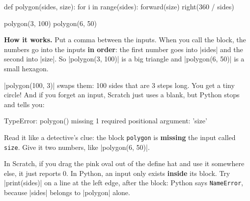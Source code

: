 \begin{tcbraster}[raster columns=2, raster equal height=rows, raster column skip=12pt, raster valign=center, raster force size=false, raster column 1/.style={add to width=-0.6cm}, raster column 2/.style={add to width=0.6cm}]
\begin{tcolorbox}[colback=white, colframe=white, boxrule=0pt, valign=center]
\begin{scratch}
\end{scratch}
\par\medskip
\begin{scratch}
\end{scratch}
\end{tcolorbox}
\begin{code}
def polygon(sides, size):
    for i in range(sides):
        forward(size)
        right(360 / sides)

polygon(3, 100)
polygon(6, 50)
\end{code}
\end{tcbraster}

\textbf{How it works.} Put a comma between the inputs. When you call the block, the numbers go into the inputs \textbf{in order}: the first number goes into \py|sides| and the second into \py|size|. So \py|polygon(3, 100)| is a big triangle and \py|polygon(6, 50)| is a small hexagon.

\begin{watchout}
\py|polygon(100, 3)| swaps them: 100 sides that are 3 steps long. You get a tiny circle! And if you forget an input, Scratch just uses a blank, but Python stops and tells you:
\begin{errorbox}
TypeError: polygon() missing 1 required positional argument: 'size'
\end{errorbox}
Read it like a detective's clue: the block \texttt{polygon} is \textbf{missing} the input called \texttt{size}. Give it two numbers, like \py|polygon(6, 50)|.
\end{watchout}

\begin{think}
In Scratch, if you drag the pink  oval out of the define hat and use it somewhere else, it just reports 0. In Python, an input only exists \textbf{inside} its block. Try \py|print(sides)| on a line at the left edge, after the block: Python says \texttt{NameError}, because \py|sides| belongs to \py|polygon| alone.
\end{think}


